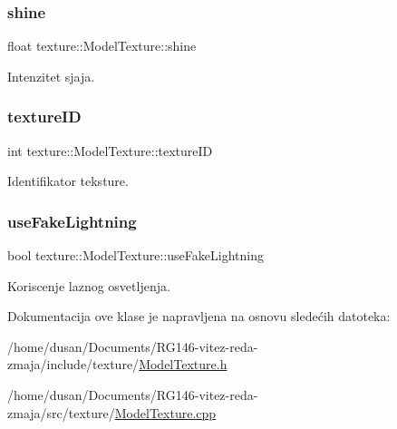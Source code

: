 \subsubsection{\texorpdfstring{shine}{shine}}
{\footnotesize\ttfamily float texture\+::\+Model\+Texture\+::shine\hspace{0.3cm}{\ttfamily [private]}}



Intenzitet sjaja. 

\mbox{\label{classtexture_1_1Texture_a0dca1304604e6b705acb0460b66fce36}} 
\subsubsection{\texorpdfstring{texture\+ID}{textureID}}
{\footnotesize\ttfamily int texture\+::\+Model\+Texture\+::texture\+ID\hspace{0.3cm}{\ttfamily [private]}}



Identifikator teksture. 

\mbox{\label{classtexture_1_1Texture_aa14650f7cc629b9f5c0ed15f82b22cad}} 
\subsubsection{\texorpdfstring{use\+Fake\+Lightning}{useFakeLightning}}
{\footnotesize\ttfamily bool texture\+::\+Model\+Texture\+::use\+Fake\+Lightning\hspace{0.3cm}{\ttfamily [private]}}



Koriscenje laznog osvetljenja. 



Dokumentacija ove klase je napravljena na osnovu sledećih datoteka\+:\begin{DoxyCompactItemize}
\item 
/home/dusan/\+Documents/\+R\+G146-\/vitez-\/reda-\/zmaja/include/texture/\hyperlink{Texture_8h}{Model\+Texture.\+h}\item 
/home/dusan/\+Documents/\+R\+G146-\/vitez-\/reda-\/zmaja/src/texture/\hyperlink{Texture_8cpp}{Model\+Texture.\+cpp}\end{DoxyCompactItemize}

